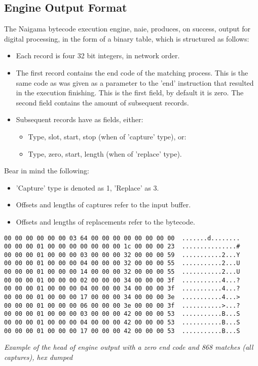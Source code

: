 \subsection{Engine Output Format}

The Naigama bytecode execution engine, naie, produces, on success, output for
digital processing, in the form of a binary table, which is structured
as follows:

\begin{itemize}

\item Each record is four 32 bit integers, in network order.

\item The first record contains the end code of the matching process.
This is the same code as was given as a parameter to the 'end'
instruction that resulted in the execution finishing. This is the
first field, by default it is zero.
The second field contains the amount of subsequent records.

\item Subsequent records have as fields, either:

\begin{itemize}
\item Type, slot, start, stop (when of 'capture' type), or:
\item Type, zero, start, length (when of 'replace' type).
\end{itemize}

\end{itemize}

Bear in mind the following:

\begin{itemize}
\item 'Capture' type is denoted as 1, 'Replace' as 3.
\item Offsets and lengths of captures refer to the input buffer.
\item Offsets and lengths of replacements refer to the bytecode.
\end{itemize}

\begin{myquote}
\begin{verbatim}
00 00 00 00 00 00 03 64 00 00 00 00 00 00 00 00  .......d........
00 00 00 01 00 00 00 00 00 00 00 1c 00 00 00 23  ...............#
00 00 00 01 00 00 00 03 00 00 00 32 00 00 00 59  ...........2...Y
00 00 00 01 00 00 00 04 00 00 00 32 00 00 00 55  ...........2...U
00 00 00 01 00 00 00 14 00 00 00 32 00 00 00 55  ...........2...U
00 00 00 01 00 00 00 02 00 00 00 34 00 00 00 3f  ...........4...?
00 00 00 01 00 00 00 04 00 00 00 34 00 00 00 3f  ...........4...?
00 00 00 01 00 00 00 17 00 00 00 34 00 00 00 3e  ...........4...>
00 00 00 01 00 00 00 06 00 00 00 3e 00 00 00 3f  ...........>...?
00 00 00 01 00 00 00 03 00 00 00 42 00 00 00 53  ...........B...S
00 00 00 01 00 00 00 04 00 00 00 42 00 00 00 53  ...........B...S
00 00 00 01 00 00 00 17 00 00 00 42 00 00 00 53  ...........B...S

\end{verbatim}
\end{myquote}
\textit{Example of the head of engine output with a zero end code
and 868 matches (all captures), hex dumped}

